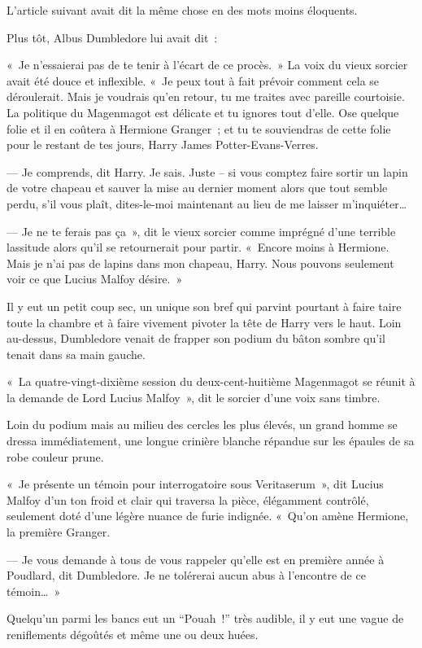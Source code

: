 L'article suivant avait dit la même chose en des mots moins éloquents.

Plus tôt, Albus Dumbledore lui avait dit~:
\begin{em}
«~Je n'essaierai pas de te tenir à l'écart de ce procès.~»
La voix du vieux sorcier avait été douce et inflexible.
«~Je peux tout à fait prévoir comment cela se déroulerait.
Mais je voudrais qu'en retour, tu me traites avec pareille courtoisie.
La politique du Magenmagot est délicate et tu ignores tout d'elle.
Ose quelque folie et il en coûtera à Hermione Granger~; et tu te souviendras de cette folie pour le restant de tes jours, Harry James Potter-Evans-Verres.

--- Je comprends, dit Harry.
Je sais.
Juste -- si vous comptez faire sortir un lapin de votre chapeau et sauver la mise au dernier moment alors que tout semble perdu, s'il vous plaît, dites-le-moi maintenant au lieu de me laisser m'inquiéter…

--- Je ne te ferais pas ça~», dit le vieux sorcier comme imprégné d'une terrible lassitude alors qu'il se retournerait pour partir.
«~Encore moins à Hermione.
Mais je n'ai pas de lapins dans mon chapeau, Harry.
Nous pouvons seulement voir ce que Lucius Malfoy désire.~»
\end{em}

Il y eut un petit coup sec, un unique son bref qui parvint pourtant à faire taire toute la chambre et à faire vivement pivoter la tête de Harry vers le haut.
Loin au-dessus, Dumbledore venait de frapper son podium du bâton sombre qu'il tenait dans sa main gauche.

«~La quatre-vingt-dixième session du deux-cent-huitième Magenmagot se réunit à la demande de Lord Lucius Malfoy~», dit le sorcier d'une voix sans timbre.

Loin du podium mais au milieu des cercles les plus élevés, un grand homme se dressa immédiatement, une longue crinière blanche répandue sur les épaules de sa robe couleur prune.

«~Je présente un témoin pour interrogatoire sous Veritaserum~», dit Lucius Malfoy d'un ton froid et clair qui traversa la pièce, élégamment contrôlé, seulement doté d'une légère nuance de furie indignée.
«~Qu'on amène Hermione, la première Granger.

--- Je vous demande à tous de vous rappeler qu'elle est en première année à Poudlard, dit Dumbledore.
Je ne tolérerai aucun abus à l'encontre de ce témoin…~»

Quelqu'un parmi les bancs eut un “Pouah~!” très audible, il y eut une vague de reniflements dégoûtés et même une ou deux huées.

